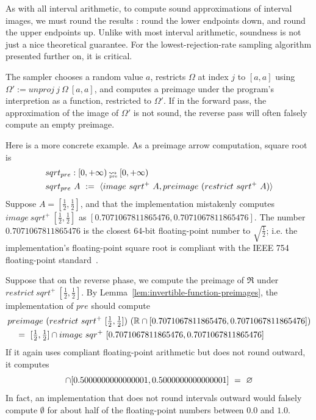 As with all interval arithmetic, to compute sound approximations of interval images, we must round the results : round the lower endpoints down, and round the upper endpoints up.
Unlike with most interval arithmetic, soundness is not just a nice theoretical guarantee.
For the lowest-rejection-rate sampling algorithm presented further on, it is critical.

The sampler chooses a random value $a$, restricts $\Omega$ at index $j$ to $[a,a]$ using $\Omega' := unproj~j~\Omega~[a,a]$, and computes a preimage under the program's interpretion as a function, restricted to $\Omega'$.
If in the forward pass, the approximation of the image of $\Omega'$ is not sound, the reverse pass will often falsely compute an empty preimage.

Here is a more concrete example.
As a preimage arrow computation, square root is
\begin{equation}
\begin{aligned}
	&sqrt_{pre} : [0,+\infty) \operatorname{\rightsquigarrow_{\mspace{-20mu}_\mathrm{pre}}}\,[0,+\infty) \\
	&sqrt_{pre}~A\ :=\ \langle{image~sqrt^+~A, preimage~(restrict~sqrt^+~A)}\rangle
\end{aligned}
\end{equation}
Suppose $A = [\frac{1}{2},\frac{1}{2}]$, and that the implementation mistakenly computes $image~sqrt^+~[\frac{1}{2},\frac{1}{2}]$ as $[0.7071067811865476,0.7071067811865476]$.
The number $0.7071067811865476$ is the closest 64-bit floating-point number to $\sqrt{\frac{1}{2}}$; i.e. the implementation's floating-point square root is compliant with the IEEE 754 floating-point standard~\cite{cit:ieee-754-2008}.

Suppose that on the reverse phase, we compute the preimage of $\Re$ under $restrict~sqrt^+~[\frac{1}{2},\frac{1}{2}]$.
By Lemma~\ref{lem:invertible-function-preimages}, the implementation of $pre$ should compute
\begin{equation}
\begin{aligned}
	&preimage~(restrict~sqrt^+~[\tfrac{1}{2},\tfrac{1}{2}])~(\mathbb{R} \cap [0.7071067811865476,0.7071067811865476])
\\
	&\ \ \ =\ [\tfrac{1}{2},\tfrac{1}{2}] \cap image~sqr^+~[0.7071067811865476,0.7071067811865476]
\end{aligned}
\end{equation}
If it again uses compliant floating-point arithmetic but does not round outward, it computes
\begin{equation}
	[\tfrac{1}{2},\tfrac{1}{2}] \i [0.5000000000000001,0.5000000000000001]\ =\ \emptyset
\end{equation}
In fact, an implementation that does not round intervals outward would falsely compute $\emptyset$ for about half of the floating-point numbers between $0.0$ and $1.0$.

